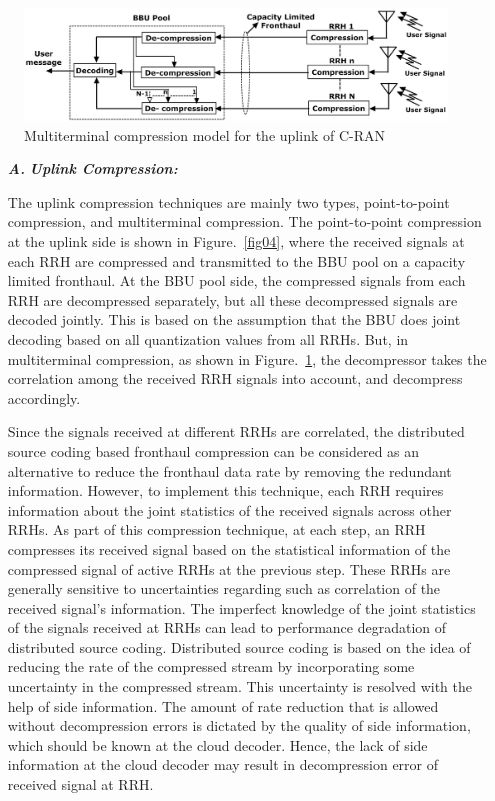\begin{figure}[H]
\centering
\includegraphics[scale=.56]{src/Figures/chap3/fig05.jpg}
\caption{Multiterminal compression model for the uplink of C-RAN}\label{fig05}
\end{figure}


\begin{multicols}{2}
\begin{itemize}

\item[{\textit{\textbf{ A.}}}] {\textit{\textbf{Uplink Compression:}}}

The uplink compression techniques are mainly two types, point-to-point compression, and multiterminal compression. The point-to-point compression at the uplink side is shown in Figure.~\ref{fig04}, where the received signals at each RRH are compressed and transmitted to the BBU pool on a capacity limited fronthaul. At the BBU pool side, the compressed signals from each RRH are decompressed separately, but all these decompressed signals are decoded jointly. This is based on the assumption that the BBU does joint decoding based on all quantization values from all RRHs. But, in multiterminal compression, as shown in Figure.~\ref{fig05}, the decompressor takes the correlation among the received RRH signals into account, and decompress accordingly.

Since the signals received at different RRHs are correlated, the distributed source coding based fronthaul compression can be considered as an alternative to reduce the fronthaul data rate by removing the redundant information. However, to implement this technique, each RRH requires information about the joint statistics of the received signals across other RRHs. As part of this compression technique, at each step, an RRH compresses its received signal based on the statistical information of the compressed signal of active RRHs at the previous step. These RRHs are generally sensitive to uncertainties regarding such as correlation of the received signal’s information. The imperfect knowledge of the joint statistics of the signals received at RRHs can lead to performance degradation of distributed source coding. Distributed source coding is based on the idea of reducing the rate of the compressed stream by incorporating some uncertainty in the compressed stream. This uncertainty is resolved with the help of side information. The amount of rate reduction that is allowed without decompression errors is dictated by the quality of side information, which should be known at the cloud decoder. Hence, the lack of side information at the cloud decoder may result in decompression error of received signal at RRH.


\end{itemize}
\end{multicols}
